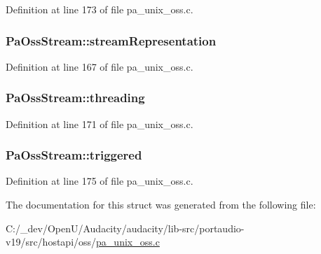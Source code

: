 Definition at line 173 of file pa\+\_\+unix\+\_\+oss.\+c.

\subsubsection[{\texorpdfstring{stream\+Representation}{streamRepresentation}}]{ Pa\+Oss\+Stream\+::stream\+Representation}\hypertarget{struct_pa_oss_stream_a0d731c9d8936b9303931b5c5fbc40f7e}{}\label{struct_pa_oss_stream_a0d731c9d8936b9303931b5c5fbc40f7e}


Definition at line 167 of file pa\+\_\+unix\+\_\+oss.\+c.

\subsubsection[{\texorpdfstring{threading}{threading}}]{ Pa\+Oss\+Stream\+::threading}\hypertarget{struct_pa_oss_stream_abed200ca0a101d18139b4773d41526f6}{}\label{struct_pa_oss_stream_abed200ca0a101d18139b4773d41526f6}


Definition at line 171 of file pa\+\_\+unix\+\_\+oss.\+c.

\subsubsection[{\texorpdfstring{triggered}{triggered}}]{ Pa\+Oss\+Stream\+::triggered}\hypertarget{struct_pa_oss_stream_abd3e8fb7cc3560fda0f0827055058915}{}\label{struct_pa_oss_stream_abd3e8fb7cc3560fda0f0827055058915}


Definition at line 175 of file pa\+\_\+unix\+\_\+oss.\+c.



The documentation for this struct was generated from the following file\+:\begin{DoxyCompactItemize}
\item 
C\+:/\+\_\+dev/\+Open\+U/\+Audacity/audacity/lib-\/src/portaudio-\/v19/src/hostapi/oss/\hyperlink{pa__unix__oss_8c}{pa\+\_\+unix\+\_\+oss.\+c}\end{DoxyCompactItemize}
